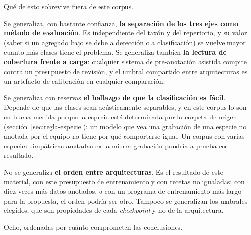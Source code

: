  Qué de esto sobrevive fuera de este corpus.

Se generaliza, con bastante confianza, \textbf{la separación de los tres ejes
    como método de evaluación}. Es independiente del taxón y del repertorio, y su
valor (saber si un agregado bajo se debe a detección o a clasificación) se
vuelve mayor cuanto más clases tiene el problema. Se generaliza también
\textbf{la lectura de cobertura frente a carga}: cualquier sistema de
pre-anotación asistida compite contra un presupuesto de revisión, y el umbral
compartido entre arquitecturas es un artefacto de calibración en cualquier
comparación.

Se generaliza con reservas \textbf{el hallazgo de que la clasificación es fácil}.
Depende de que las clases sean acústicamente separables, y en este corpus lo son
en buena medida porque la especie está determinada por la carpeta de origen
(sección~\ref{sec:regla-especie}): un modelo que vea una grabación de una especie
no anotada por el equipo no tiene por qué comportarse igual. Un corpus con varias
especies simpátricas anotadas en la misma grabación pondría a prueba ese
resultado.

No se generaliza \textbf{el orden entre arquitecturas}. Es el resultado de este
material, con este presupuesto de entrenamiento y con recetas no igualadas; con
diez veces más datos anotados, o con un programa de entrenamiento más largo para
la propuesta, el orden podría ser otro. Tampoco se generalizan los umbrales
elegidos, que son propiedades de cada \textit{checkpoint} y no de la arquitectura.

 Ocho, ordenadas por cuánto comprometen las conclusiones.

